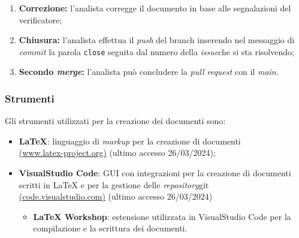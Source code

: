 \begin{itemize}
\begin{enumerate}
		      \item \textbf{Correzione:} l'analista corregge il documento
		            in base alle segnalazioni del verificatore;

		      \item \textbf{Chiusura:} l'analista effettua il \textit{push} del
		            branch inserendo nel messaggio di \textit{commit} la parola
		            \texttt{close} seguita dal numero della \textit{issue}\g che si sta
		            risolvendo;

		      \item \textbf{Secondo \textit{merge}:} l'analista può concludere la
		            \textit{pull request} con il \textit{main}.
	      \end{enumerate}
\end{itemize}

\subsubsection{Strumenti}
Gli strumenti utilizzati per la creazione dei documenti sono:
\begin{itemize}
	\item \textbf{LaTeX}: linguaggio di \textit{markup} per la creazione di documenti \\
	      \href{https://www.latex-project.org/}{(www.latex-project.org)} (ultimo accesso 26/03/2024);
	\item \textbf{VisualStudio Code}: GUI con integrazioni per la creazione di documenti scritti in LaTeX e per la gestione delle \textit{repository}\g git\g \\
	      \href{https://code.visualstudio.com/}{(code.visualstudio.com)} (ultimo accesso 26/03/2024)
	      \begin{itemize}
		      \item \textbf{LaTeX Workshop}: estensione utilizzata in VisualStudio Code per la compilazione e la scrittura dei documenti.
	      \end{itemize}
\end{itemize}

